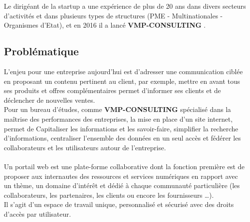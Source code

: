 \documentclass[12pt]{article}
\begin{document}
Le dirigéant de la startup a une expérience de plus de 20 ans dans divers secteurs d'activités et dans plusieurs types de structures (PME - Multinationales - Organismes d'Etat), et en 2016 il a lancé       \textbf{VMP-CONSULTING} .



 \subsection{Problématique}

L’enjeu pour une entreprise aujourd'hui est d’adresser une communication ciblée en proposant un contenu pertinent au client, par exemple, mettre en avant tous ses produits et offres complémentaires permet d’informer ses clients et de déclencher de nouvelles ventes. \\ 
Pour un bureau d’études, comme \textbf{VMP-CONSULTING}  spécialisé dans la maîtrise des performances des entreprises, la mise en place d'un site internet,  permet de  Capitaliser les informations et les savoir-faire,
    simplifier la recherche d’informations,
    centraliser l’ensemble des données en un seul accès et
    fédérer les collaborateurs et les utilisateurs autour de l’entreprise.
\\ \\

Un portail web est une plate-forme collaborative dont la fonction première est de proposer aux internautes des ressources et services numériques en rapport avec un thème, un domaine d’intérêt et dédié à chaque communauté particulière (les collaborateurs, les partenaires, les clients ou encore les fournisseurs …). \\
Il s’agit d’un espace de travail unique, personnalisé et sécurisé avec des droits d’accès par utilisateur.\\ \\
\end{document}
